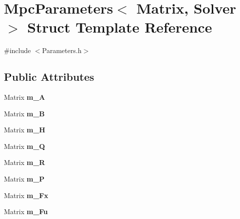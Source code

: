\hypertarget{structMpcParameters}{}\section{Mpc\+Parameters$<$ Matrix, Solver $>$ Struct Template Reference}
\label{structMpcParameters}


{\ttfamily \#include $<$Parameters.\+h$>$}

\subsection*{Public Attributes}
\begin{DoxyCompactItemize}
\item 
\mbox{\label{structMpcParameters_a79445e0b7c110fc851cbadb75a5d28f6}} 
Matrix {\bfseries m\+\_\+A}
\item 
\mbox{\label{structMpcParameters_ab79d562d3a42d137a0eda18ca8027fcb}} 
Matrix {\bfseries m\+\_\+B}
\item 
\mbox{\label{structMpcParameters_a13ba8bf485b3bae0041c919187a6706e}} 
Matrix {\bfseries m\+\_\+H}
\item 
\mbox{\label{structMpcParameters_a9c5d33307452c94180f11fb7314e60b2}} 
Matrix {\bfseries m\+\_\+Q}
\item 
\mbox{\label{structMpcParameters_ac8f6e1d3ed3284f0933ac0322ee8d6fb}} 
Matrix {\bfseries m\+\_\+R}
\item 
\mbox{\label{structMpcParameters_a7fd057b268d80c18324fa8d290c861a5}} 
Matrix {\bfseries m\+\_\+P}
\item 
\mbox{\label{structMpcParameters_aa6d3751ae7b0c3451e4ff1784ea51414}} 
Matrix {\bfseries m\+\_\+\+Fx}
\item 
\mbox{\label{structMpcParameters_a351c4c9571448599dd6a316aab86a561}} 
Matrix {\bfseries m\+\_\+\+Fu}
\item 
\mbox{\label{structMpcParameters_ac5cfb3944597177d897690d075d26352}} 

\end{DoxyCompactItemize}

